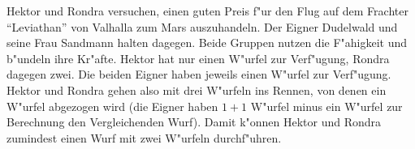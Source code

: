 \medskip
\begin{ruleexample}
    Hektor und Rondra versuchen, einen guten Preis f"ur den Flug auf dem Frachter "`Leviathan"' von Valhalla zum Mars auszuhandeln. Der Eigner Dudelwald und seine Frau Sandmann halten dagegen. Beide Gruppen nutzen die F"ahigkeit  und b"undeln ihre Kr"afte. Hektor hat nur einen W"urfel zur Verf"ugung, Rondra dagegen zwei. Die beiden Eigner haben jeweils einen W"urfel zur Verf"ugung. Hektor und Rondra gehen also mit drei W"urfeln ins Rennen, von denen ein W"urfel abgezogen wird (die Eigner haben $1+1$ W"urfel minus ein W"urfel zur Berechnung den Vergleichenden Wurf). Damit k"onnen Hektor und Rondra zumindest einen Wurf mit zwei W"urfeln durchf"uhren.
\end{ruleexample}

